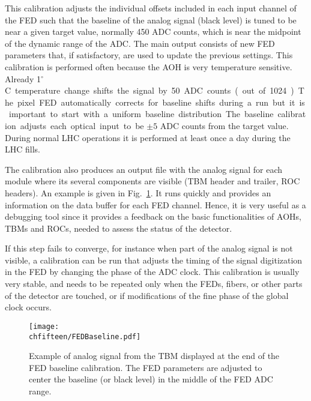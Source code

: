 This calibration adjusts the individual offsets included in each input channel of the FED such that the baseline of the analog signal (black level) is tuned to be near a given target value, normally 450 ADC counts, which is near the midpoint of the dynamic range of the ADC. The main output consists of new FED parameters that, if satisfactory, are used to update the previous settings.
This calibration is performed often because the AOH is very temperature sensitive. Already 1\unit{$^\circ$C} temperature change shifts the signal by 50 ADC counts (out of 1024).
The pixel FED automatically corrects for baseline shifts during a run but it is important to start with a uniform baseline distribution.
The baseline calibration adjusts each optical input to be $\pm5$ ADC counts from the target value. During normal LHC operations it is performed at least once a day during the LHC fills.

The calibration also produces an output file with the analog signal for each module where its several components are visible (TBM header and trailer, ROC headers). An example is given in Fig.~\ref{fig:FEDBaseline}.
It runs quickly and provides an information on the data buffer for each FED channel. Hence, it is very useful as a debugging tool since it provides a feedback on the basic functionalities of AOHs, TBMs and ROCs, needed to assess the status of the detector.

If this step fails to converge, for instance when part of the analog signal is not visible, a calibration can be run that adjusts the timing of the signal digitization in the FED by changing the phase of the ADC clock.
This calibration is usually very stable, and needs to be repeated only when the FEDs, fibers, or other parts of the detector are touched, or if modifications of the fine phase of the global clock occurs.

\begin{figure}[!htb]
 \begin{center}
 \texttt{[image: \\chfifteen/FEDBaseline.pdf]}
 \end{center}
 \caption{Example of analog signal from the TBM displayed at the end of the FED baseline calibration. The FED parameters are adjusted to center the baseline (or black level) in the middle of the FED ADC range.}
 \label{fig:FEDBaseline}
\end{figure}

